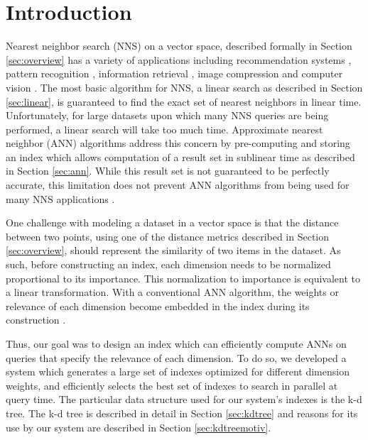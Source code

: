 \chapter{Introduction} %

\label{futurework} %


Nearest neighbor search (NNS) on a vector space, described formally in Section \ref{sec:overview} has a variety of applications including recommendation systems \citep{suchal2010full}, pattern recognition \citep{cover1967nearest}, information retrieval \citep{manning2008introduction}, image compression \citep{tong2002adaptive} and computer vision \citep{boiman2008defense}.  The most basic algorithm for NNS, a linear search as described in Section \ref{sec:linear}, is guaranteed to find the exact set of nearest neighbors in linear time.  Unfortunately, for large datasets upon which many NNS queries are being performed, a linear search will take too much time.  Approximate nearest neighbor (ANN) algorithms address this concern by pre-computing and storing an index which allows computation of a result set in sublinear time as described in Section \ref{sec:ann}.  While this result set is not guaranteed to be perfectly accurate, this limitation does not prevent ANN algorithms from being used for many NNS applications \citep{arya1996nearest}.

One challenge with modeling a dataset in a vector space is that the distance between two points, using one of the distance metrics described in Section \ref{sec:overview}, should represent the similarity of two items in the dataset.  As such, before constructing an index, each dimension needs to be normalized proportional to its importance.  This normalization to importance is equivalent to a linear transformation.  With a conventional ANN algorithm, the weights or relevance of each dimension become embedded in the index during its construction \citep{flann_pami_2014}.

Thus, our goal was to design an index which can efficiently compute ANNs on queries that specify the relevance of each dimension.  To do so, we developed a system which generates a large set of indexes optimized for different dimension weights, and efficiently selects the best set of indexes to search in parallel at query time.  The particular data structure used for our system's indexes is the k-d tree.  The k-d tree is described in detail in Section \ref{sec:kdtree} and reasons for its use by our system are described in Section \ref{sec:kdtreemotiv}.

